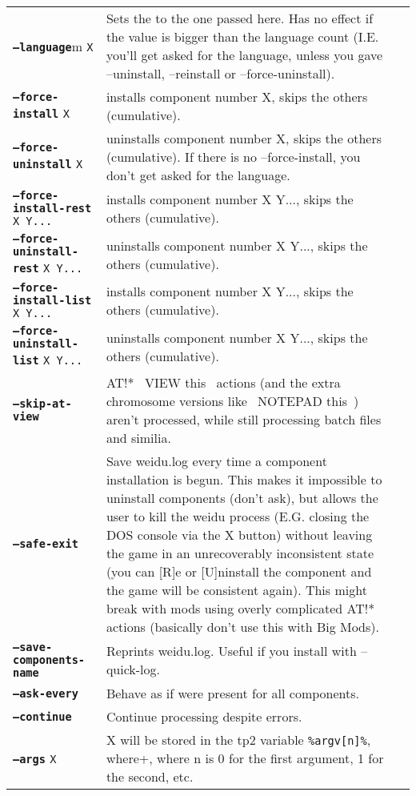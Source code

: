 \documentclass{article}
\def\ttref#1{\ahrefloc{#1}{\tt #1}}
\def\DEFINE#1{{\tt \bf #1}\label{#1}\index{#1}}
\def\t#1{{\tt #1}}
\begin{document}
\begin{tabular}{lp{10in}|p{10in}}
\DEFINE{--language}m  \t{X}   & Sets the \ttref{TP2} \ttref{Language} to the one
passed here. Has no effect if the value is bigger than the language count
(I.E. you'll get asked for the language, unless you gave --uninstall, --reinstall
or --force-uninstall). \\
\DEFINE{--force-install} \t{X} & installs component number X, skips the others (cumulative). \\
\DEFINE{--force-uninstall} \t{X} & uninstalls component number X, skips the others (cumulative).
If there is no --force-install, you don't get asked for the language. \\
\DEFINE{--force-install-rest} \t{X Y...} & installs component number X Y...,
skips the others (cumulative). \\
\DEFINE{--force-uninstall-rest} \t{X Y...} & uninstalls component number X Y...,
skips the others (cumulative). \\
\DEFINE{--force-install-list} \t{X Y...} & installs component number X Y...,
skips the others (cumulative). \\
\DEFINE{--force-uninstall-list} \t{X Y...} & uninstalls component number X Y...,
skips the others (cumulative). \\
\DEFINE{--skip-at-view} & AT!* ~VIEW this~ actions (and the extra chromosome versions like
~NOTEPAD this~) aren't processed, while still processing batch files and similia. \\
\DEFINE{--safe-exit} & Save weidu.log every time a component installation is begun.
This makes it impossible to uninstall components (don't ask), but allows the user to kill
the weidu process (E.G. closing the DOS console via the X button) without leaving the game in an
unrecoverably inconsistent state (you can [R]e or [U]ninstall the component and the game will be
consistent again). This might break with mods using overly complicated AT!* actions (basically
don't use this with Big Mods). \\
\DEFINE{--save-components-name} & Reprints weidu.log. Useful if you install with --quick-log. \\
\DEFINE{--ask-every}    & Behave as if \ttref{ASK!EVERY!COMPONENT} were
present for all \ttref{TP2} components. \\
\DEFINE{--continue}     & Continue \ttref{TP2} processing despite
\ttref{TP2 Action} errors. \\
\DEFINE{--args} \t{X}       & X will be stored in the tp2 variable \verb+%argv[n]%+, where
n is 0 for the first argument, 1 for the second, etc. 


\end{tabular}
\end{document}
